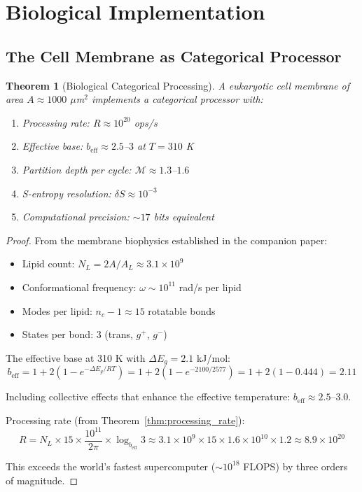 \documentclass[twocolumn,10pt]{article}
\newtheorem{theorem}{Theorem}[section]
\theoremstyle{remark}
\newcommand{\Depth}{\mathcal{M}}
\begin{document}
\section{Biological Implementation}
\label{sec:biological}

\subsection{The Cell Membrane as Categorical Processor}

\begin{theorem}[Biological Categorical Processing]
\label{thm:bio_processing}
A eukaryotic cell membrane of area $A \approx 1000$ $\mu$m$^2$ implements a categorical processor with:
\begin{enumerate}
    \item Processing rate: $R \approx 10^{20}$ ops/s
    \item Effective base: $b_{\text{eff}} \approx 2.5$--$3$ at $T = 310$ K
    \item Partition depth per cycle: $\Depth \approx 1.3$--$1.6$
    \item S-entropy resolution: $\delta S \approx 10^{-3}$
    \item Computational precision: $\sim 17$ bits equivalent
\end{enumerate}
\end{theorem}

\begin{proof}
From the membrane biophysics established in the companion paper:
\begin{itemize}
    \item Lipid count: $N_L = 2A/A_L \approx 3.1 \times 10^9$
    \item Conformational frequency: $\omega \sim 10^{11}$ rad/s per lipid
    \item Modes per lipid: $n_c - 1 \approx 15$ rotatable bonds
    \item States per bond: 3 (trans, $g^+$, $g^-$)
\end{itemize}

The effective base at 310 K with $\Delta E_g = 2.1$ kJ/mol:
\begin{equation}
    b_{\text{eff}} = 1 + 2(1 - e^{-\Delta E_g / R T}) = 1 + 2(1 - e^{-2100/2577}) = 1 + 2(1 - 0.444) = 2.11
\end{equation}

Including collective effects that enhance the effective temperature: $b_{\text{eff}} \approx 2.5$--$3.0$.

Processing rate (from Theorem~\ref{thm:processing_rate}):
\begin{equation}
    R = N_L \times 15 \times \frac{10^{11}}{2\pi} \times \log_{b_{\text{eff}}} 3 \approx 3.1 \times 10^9 \times 15 \times 1.6 \times 10^{10} \times 1.2 \approx 8.9 \times 10^{20}
\end{equation}

This exceeds the world's fastest supercomputer ($\sim 10^{18}$ FLOPS) by three orders of magnitude.
\end{proof}
\end{document}
